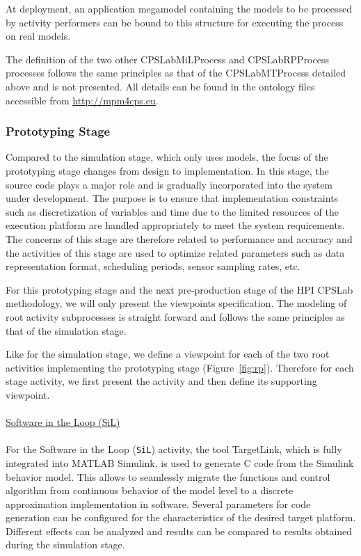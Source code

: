At deployment, an application megamodel containing the models to be processed by activity performers can be bound to this structure for executing the process on real models.

The definition of the two other CPSLabMiLProcess and CPSLabRPProcess processes follows the same principles as that of the CPSLabMTProcess detailed above and is not presented. All details can be found in the ontology files accessible from \url{http://mpm4cps.eu}. 
\\
\subsubsection{Prototyping Stage}
%
Compared to the simulation stage, which only uses models, the focus of the prototyping stage changes from design to implementation. In this stage, the source code plays a major role and is gradually incorporated into the system under development. The purpose is to ensure that implementation constraints such as discretization of variables and time due to the limited resources of the execution platform are handled appropriately to meet the system requirements. The concerns of this stage are therefore related to performance and accuracy and the activities of this stage are used to optimize related parameters such as data representation format, scheduling periods, sensor sampling rates, etc.

For this prototyping stage and the next pre-production stage of the HPI CPSLab methodology, we will only present the viewpoints specification. The modeling of root activity subprocesses is straight forward and follows the same principles as that of the simulation stage. 

Like for the simulation stage, we define a viewpoint for each of the two root activities implementing the prototyping stage (Figure~\ref{fig:rp}). Therefore for each stage activity, we first present the activity and then define its supporting viewpoint.
\\
\\
\uline{Software in the Loop (SiL)}
\\
\\
For the Software in the Loop (\texttt{SiL}) activity, the tool TargetLink, which is fully integrated into MATLAB Simulink, is used to generate C code from the Simulink behavior model. This allows to seamlessly migrate the functions and control algorithm from continuous behavior of the model level to a discrete approximation implementation in software. Several parameters for code generation can be configured for the characteristics of the desired target platform. Different effects can be analyzed and results can be compared to results obtained during the simulation stage.


